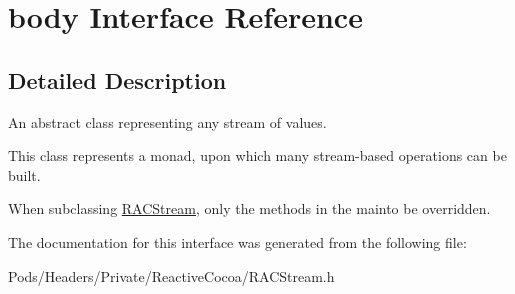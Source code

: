 \hypertarget{interfacebody}{}\section{body Interface Reference}
\label{interfacebody}


\subsection{Detailed Description}
An abstract class representing any stream of values.

This class represents a monad, upon which many stream-\/based operations can be built.

When subclassing \mbox{\hyperlink{interface_r_a_c_stream}{R\+A\+C\+Stream}}, only the methods in the mainto be overridden. 

The documentation for this interface was generated from the following file\+:\begin{DoxyCompactItemize}
\item 
Pods/\+Headers/\+Private/\+Reactive\+Cocoa/R\+A\+C\+Stream.\+h\end{DoxyCompactItemize}
